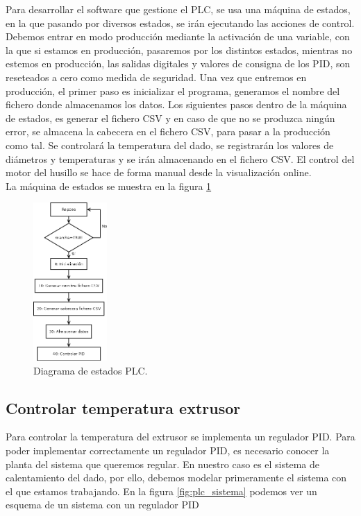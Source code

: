 Para desarrollar el software que gestione el PLC, se usa una máquina de estados, en la que pasando por diversos estados, se irán ejecutando las acciones de control. Debemos entrar en modo producción mediante la activación de una variable, con la que si estamos en producción, pasaremos por los distintos estados, mientras no estemos en producción, las salidas digitales y valores de consigna de los PID, son reseteados a cero como medida de seguridad. Una vez que entremos en producción, el primer paso es inicializar el programa, generamos el nombre del fichero donde almacenamos los datos. Los siguientes pasos dentro de la máquina de estados, es generar el fichero CSV y en caso de que no se produzca ningún error, se almacena la cabecera en el fichero CSV, para pasar a la producción como tal. Se controlará la temperatura del dado, se registrarán los valores de diámetros y temperaturas y se irán almacenando en el fichero CSV. El control del motor del husillo se hace de forma manual desde la visualización online.\\

La máquina de estados se muestra en la figura \ref{fig:plc_estados}

\begin{figure}[H]
    \centering
    \includegraphics[width=0.25\textwidth]{images/PLC/diagrama.png}
    \caption[Diagrama de estados PLC.]{Diagrama de estados PLC.}
    \label{fig:plc_estados}
\end{figure}

\subsection{Controlar temperatura extrusor}
\label{sec:plc_PID}

Para controlar la temperatura del extrusor se implementa un regulador PID. Para poder implementar correctamente un regulador PID, es necesario conocer la planta del sistema que queremos regular. En nuestro caso es el sistema de calentamiento del dado, por ello, debemos modelar primeramente el sistema con el que estamos trabajando. En la figura \ref{fig:plc_sistema} podemos ver un esquema de un sistema con un regulador PID\\

